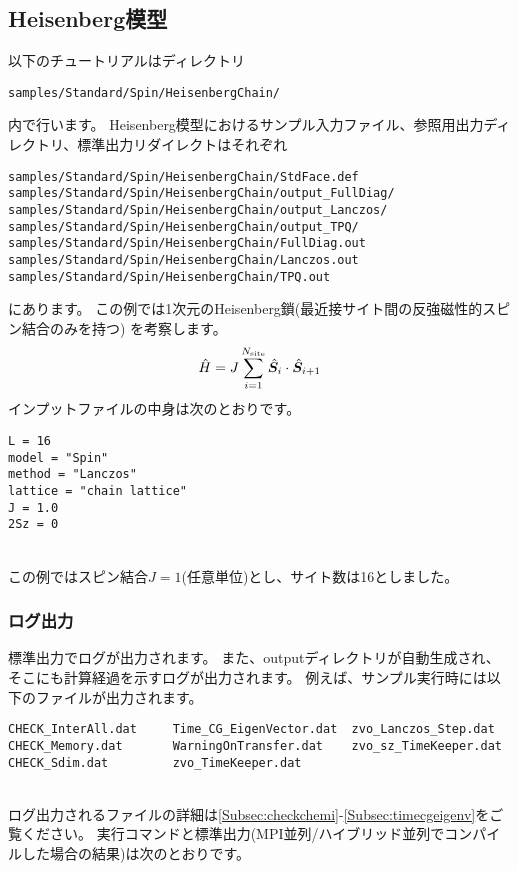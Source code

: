 \subsection{Heisenberg模型}

以下のチュートリアルはディレクトリ
\begin{verbatim}
samples/Standard/Spin/HeisenbergChain/
\end{verbatim}
内で行います。
Heisenberg模型におけるサンプル入力ファイル、参照用出力ディレクトリ、標準出力リダイレクトはそれぞれ
\begin{verbatim}
samples/Standard/Spin/HeisenbergChain/StdFace.def
samples/Standard/Spin/HeisenbergChain/output_FullDiag/
samples/Standard/Spin/HeisenbergChain/output_Lanczos/
samples/Standard/Spin/HeisenbergChain/output_TPQ/
samples/Standard/Spin/HeisenbergChain/FullDiag.out
samples/Standard/Spin/HeisenbergChain/Lanczos.out
samples/Standard/Spin/HeisenbergChain/TPQ.out
\end{verbatim}
にあります。
この例では1次元のHeisenberg鎖(最近接サイト間の反強磁性的スピン結合のみを持つ)
を考察します。
\begin{align}
  {\hat H} = J \sum_{i=1}^{N_{\rm site}} {\hat {\boldsymbol S}}_i \cdot {\hat {\boldsymbol S}}_{i+1}
\end{align}
インプットファイルの中身は次のとおりです。
\\
\begin{minipage}{10cm}
\begin{screen}
\begin{verbatim}
L = 16
model = "Spin"
method = "Lanczos"
lattice = "chain lattice"
J = 1.0
2Sz = 0
\end{verbatim}
\end{screen}
\end{minipage}
%
\\
この例ではスピン結合$J=1$(任意単位)とし、サイト数は16としました。

\subsubsection{ログ出力}
標準出力でログが出力されます。
また、outputディレクトリが自動生成され、
そこにも計算経過を示すログが出力されます。
例えば、サンプル実行時には以下のファイルが出力されます。\\
\begin{minipage}{16cm}
\begin{screen}
\begin{verbatim}
CHECK_InterAll.dat     Time_CG_EigenVector.dat  zvo_Lanczos_Step.dat  
CHECK_Memory.dat       WarningOnTransfer.dat    zvo_sz_TimeKeeper.dat
CHECK_Sdim.dat         zvo_TimeKeeper.dat
\end{verbatim}
\end{screen}
\end{minipage}
\\
ログ出力されるファイルの詳細は\ref{Subsec:checkchemi}-\ref{Subsec:timecgeigenv}をご覧ください。
%
実行コマンドと標準出力{(MPI並列/ハイブリッド並列でコンパイルした場合の結果)}は次のとおりです。

